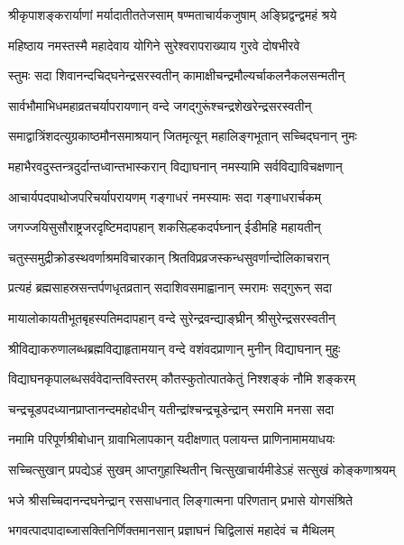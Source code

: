 \twolineshloka
{श्रीकृपाशङ्करार्याणां मर्यादातीततेजसाम्}
{षण्मताचार्यकजुषाम् अङ्घ्रिद्वन्द्वमहं श्रये}%

\twolineshloka
{महिष्ठाय नमस्तस्मै महादेवाय योगिने}
{सुरेश्वरापराख्याय गुरवे दोषभीरवे}%

\twolineshloka
{स्तुमः सदा शिवानन्दचिद्घनेन्द्रसरस्वतीन्}
{कामाक्षीचन्द्रमौल्यर्चाकलनैकलसन्मतीन्}%

\twolineshloka
{सार्वभौमाभिधमहाव्रतचर्यापरायणान्}
{वन्दे जगद्गुरूंश्चन्द्रशेखरेन्द्रसरस्वतीन्}%

\twolineshloka
{समाद्वात्रिंशदत्युग्रकाष्ठमौनसमाश्रयान्}
{जितमृत्यून् महालिङ्गभूतान् सच्चिद्घनान् नुमः}%

\twolineshloka
{महाभैरवदुस्तन्त्रदुर्दान्तध्वान्तभास्करान्}
{विद्याघनान् नमस्यामि सर्वविद्याविचक्षणान्}%

\twolineshloka
{आचार्यपदपाथोजपरिचर्यापरायणम्}
{गङ्गाधरं नमस्यामः सदा गङ्गाधरार्चकम्}%

\twolineshloka
{जगज्जयिसुसौराष्ट्रजरदृष्टिमदापहान्}
{शकसिल्हकदर्पघ्नान् ईडीमहि महायतीन्}%

\twolineshloka
{चतुस्समुद्रीक्रोडस्थवर्णाश्रमविचारकान्}
{श्रितविप्रव्रजस्कन्धसुवर्णान्दोलिकाचरान्}%

\twolineshloka
{प्रत्यहं ब्रह्मसाहस्रसन्तर्पणधृतव्रतान्}
{सदाशिवसमाह्वानान् स्मरामः सद्गुरून् सदा}%

\twolineshloka
{मायालोकायतीभूतबृहस्पतिमदापहान्}
{वन्दे सुरेन्द्रवन्द्याङ्घ्रीन् श्रीसुरेन्द्रसरस्वतीन्}%

\twolineshloka
{श्रीविद्याकरुणालब्धब्रह्मविद्याहृतामयान्}
{वन्दे वशंवदप्राणान् मुनीन् विद्याघनान् मुहुः}%

\twolineshloka
{विद्याघनकृपालब्धसर्ववेदान्तविस्तरम्}
{कौतस्कुतोत्पातकेतुं निश्शङ्कं नौमि शङ्करम्}%

\twolineshloka
{चन्द्रचूडपदध्यानप्राप्तानन्दमहोदधीन्}
{यतीन्द्रांश्चन्द्रचूडेन्द्रान् स्मरामि मनसा सदा}%

\twolineshloka
{नमामि परिपूर्णश्रीबोधान् ग्रावाभिलापकान्}
{यदीक्षणात् पलायन्त प्राणिनामामयाधयः}%

\twolineshloka
{सच्चित्सुखान् प्रपद्येऽहं सुखम् आप्तगुहास्थितीन्} %
{चित्सुखाचार्यमीडेऽहं सत्सुखं कोङ्कणाश्रयम्} %

\twolineshloka
{भजे श्रीसच्चिदानन्दघनेन्द्रान् रससाधनात्}
{लिङ्गात्मना परिणतान् प्रभासे योगसंश्रिते}%

\twolineshloka
{भगवत्पादपादाब्जासक्तिनिर्णिक्तमानसान्}
{प्रज्ञाघनं चिद्विलासं महादेवं च मैथिलम्}%

